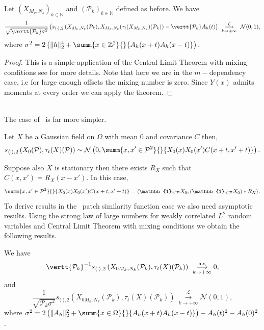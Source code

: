 \begin{prop}
  Let $(X_{M_k,N_k})_{k \in \mathbb{N}}$ and
  $\left(\mathcal{P}_k\right)_{k \in \mathbb{N}}$ defined as before. We have
  \[\frac{1}{ \sqrt{\vertt{\mathcal{P}_k}\sigma^2}} \left(s_{\langle \cdot
        \rangle,2}\left(X_{M_k,N_k}(\mathcal{P}_k),
        X_{M_k,N_k}(\tau_t(X_{M_k,N_k})(\mathcal{P}_k) \right) -
      \vertt{\mathcal{P}_k}A_h(t)\right) \ \underset{k \rightarrow
      +\infty}{\overset{\mathcal{L}}{\longrightarrow}} \ \mathcal{N}(0,1),\]
  where
  $\sigma^2 = 2 \left( \| h \|_2^4 + \summ{x \in
      \mathbb{Z}^2}{}{A_h(x+t)A_h(x-t)}\right).$
\end{prop}
\begin{proof}
  This is a simple application of the Central Limit Theorem with mixing
  conditions see \cite{billingsley2013convergence} for more details. Note that
  here we are in the $m-$dependency case, i.e for large enough offsets the mixing
  number is zero. Since $Y(x)$ admits moments at every order we can apply the
  theorem.
\end{proof}
\\
The case of \templatematching \ is far more simpler.
\begin{prop}
  Let $X$ be a Gaussian field on $\Omega$ with mean $0$ and covariance $C$ then,
  \[s_{\langle \cdot \rangle, 2}\left( X_0(\mathcal{P}),
      \tau_t(X)(\mathcal{P})\right) \sim \mathcal{N}\left(0,\summ{x,x' \in
        \mathcal{P}^2}{}{X_0(x)X_0(x')C(x+t,x'+t)} \right).\]
\end{prop}
Suppose also $X$ is stationary then there exists $R_X$ such that
$C(x,x') = R_X(x-x')$. In this case,
\[\summ{x,x' \in \mathcal{P}^2}{}{X_0(x)X_0(x')C(x+t,x'+t)} = \langle
  \mathbb{1}_{\cdot \in \mathcal{P}}X_0, \left(\mathbb{1}_{\cdot \in
      \mathcal{P}}X_0\right) * R_X\rangle.\] To derive results in the \scos \
patch similarity function case we also need asymptotic results. Using the strong
law of large numbers for weakly correlated $L^2$ random variables and Central
Limit Theorem with mixing conditions we obtain the following results.
\begin{prop}
  We have
  \[
    \vertt{\mathcal{P}_k}^{-1} s_{\langle \cdot \rangle,2} \left(X_{0
        M_k,N_k}(\mathcal{P}_k), \tau_t(X)(\mathcal{P}_k) \right) \
    \overset{\text{a.s}}{\underset{k \rightarrow +\infty}{\longrightarrow}} 0,\]
  and
  \[
    \frac{1}{\sqrt{\mathcal{P}_k \sigma^2}} s_{\langle \cdot \rangle,2}
    \left(X_{0 M_k,N_k}(\mathcal{P}_k), \tau_t(X)(\mathcal{P}_k) \right) \
    \overset{\mathcal{L}}{\underset{k \rightarrow +\infty}{\longrightarrow}}
    \mathcal{N}(0,1),\] where
    $\sigma^2 = 2 \left(\|A_h\|_2^2 + \summ{x \in
      \Omega}{}{A_h(x+t)A_h(x-t)}\right) - A_h(t)^2 - A_h(0)^2$.

\end{prop}

